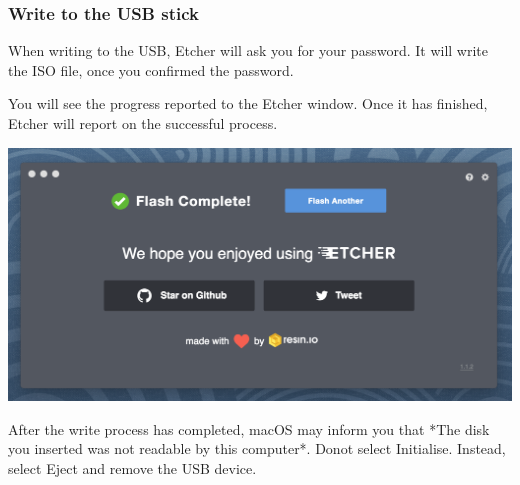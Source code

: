 \subsubsection{Write to the USB stick}

When writing to the USB, Etcher will ask you for your password. It will
write the ISO file, once you confirmed the password.

You will see the progress reported to the Etcher window. Once it has
finished, Etcher will report on the successful process.

\includegraphics[width=0.8\columnwidth]{images/4207a01ff6afea52.png}

\begin{WARNING}

After the write process has completed, macOS may inform you that *The
disk you inserted was not readable by this computer*. Donot select
Initialise. Instead, select Eject and remove the USB device.

\end{WARNING}

